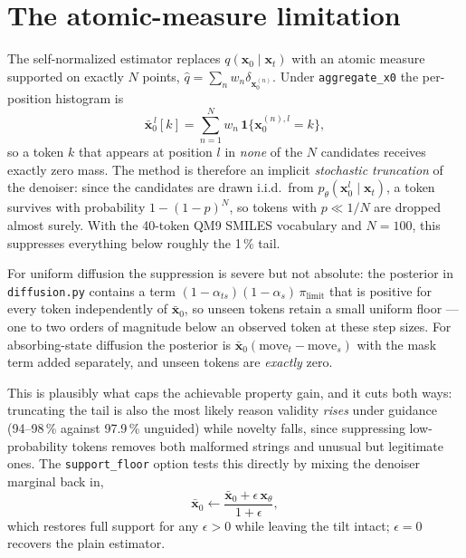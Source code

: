 \documentclass[11pt]{article}
\begin{document}
\section{The atomic-measure limitation}
\label{sec:support}

The self-normalized estimator replaces $q(\mathbf{x}_0 \mid \mathbf{x}_t)$ with
an atomic measure supported on exactly $N$ points,
$\hat{q} = \sum_n w_n \delta_{\mathbf{x}_0^{(n)}}$. Under
\texttt{aggregate\_x0} the per-position histogram is
\begin{equation}
\bar{\mathbf{x}}_0^{\,l}[k]
  = \sum_{n=1}^{N} w_n \, \mathbf{1}\{\mathbf{x}_0^{(n),l} = k\},
\end{equation}
so a token $k$ that appears at position $l$ in \emph{none} of the $N$
candidates receives exactly zero mass. The method is therefore an implicit
\emph{stochastic truncation} of the denoiser: since the candidates are drawn
i.i.d.\ from $p_\theta(\mathbf{x}_0^l \mid \mathbf{x}_t)$, a token survives with
probability $1 - (1 - p)^N$, so tokens with $p \ll 1/N$ are dropped almost
surely. With the 40-token QM9 SMILES vocabulary and $N = 100$, this suppresses
everything below roughly the 1\,\% tail.

For uniform diffusion the suppression is severe but not absolute: the posterior
in \texttt{diffusion.py} contains a term
$(1 - \alpha_{ts})(1 - \alpha_s)\,\pi_{\text{limit}}$ that is positive for every
token independently of $\bar{\mathbf{x}}_0$, so unseen tokens retain a small
uniform floor --- one to two orders of magnitude below an observed token at
these step sizes. For absorbing-state diffusion the posterior is
$\bar{\mathbf{x}}_0(\text{move}_t - \text{move}_s)$ with the mask term added
separately, and unseen tokens are \emph{exactly} zero.

This is plausibly what caps the achievable property gain, and it cuts both
ways: truncating the tail is also the most likely reason validity \emph{rises}
under guidance (94--98\,\% against 97.9\,\% unguided) while novelty falls, since
suppressing low-probability tokens removes both malformed strings and unusual
but legitimate ones. The \texttt{support\_floor} option tests this directly by
mixing the denoiser marginal back in,
\begin{equation}
\bar{\mathbf{x}}_0 \leftarrow
  \frac{\bar{\mathbf{x}}_0 + \epsilon\, \mathbf{x}_\theta}{1 + \epsilon},
\end{equation}
which restores full support for any $\epsilon > 0$ while leaving the tilt
intact; $\epsilon = 0$ recovers the plain estimator.
\end{document}
